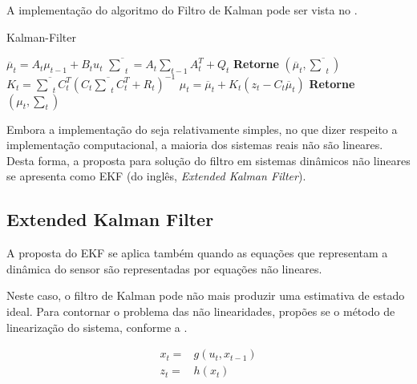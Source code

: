 A implementação do algoritmo do Filtro de Kalman pode ser vista no .

\begin{algorithm}[H]
    \caption{Kalman-Filter}
    \begin{algorithmic}[1]
        \State $\overline{\mu}_t = A_t\mu_{t-1} + B_t u_t$
        \State $ \overline{\textstyle\sum}_t = A_t {\textstyle\sum}_{t-1} A_t^T+ Q_t$ 
        \State \textbf{Retorne} $\left(\overline{\mu}_t, \overline{\textstyle\sum}_t\right)$
    \EndProcedure
        \State $K_t = \overline{\textstyle\sum}_tC_t^T(C_t\overline{\textstyle\sum}_tC_t^T+R_t)^{-1}$
        \State $\mu_t  = \overline{\mu}_t + K_t(z_t -C_t\overline\mu_t)$
        \State \textbf{Retorne} $\left(\mu_t, \textstyle\sum_t\right)$
    \EndProcedure
    \end{algorithmic}
    \label{algo:kf}
\end{algorithm}

Embora a implementação do  seja relativamente simples, no que dizer respeito a implementação computacional, a maioria dos sistemas reais não são lineares. Desta forma, a proposta para solução do filtro em sistemas dinâmicos não lineares se apresenta como EKF (do inglês, \textit{Extended Kalman Filter}).


\subsection{Extended Kalman Filter}

A proposta do EKF se aplica também quando as equações que representam a dinâmica do sensor são representadas por equações não lineares.

Neste caso, o filtro de Kalman pode não mais produzir uma estimativa de estado ideal. Para contornar o problema das não linearidades, propões se o método de linearização do sistema, conforme a .

\begin{equation}
    \begin{split}
    x_t = & g(u_t, x_{t-1})\\
    z_t = & h(x_t)
    \end{split}
    \label{eq:ekf1}
\end{equation}
    
